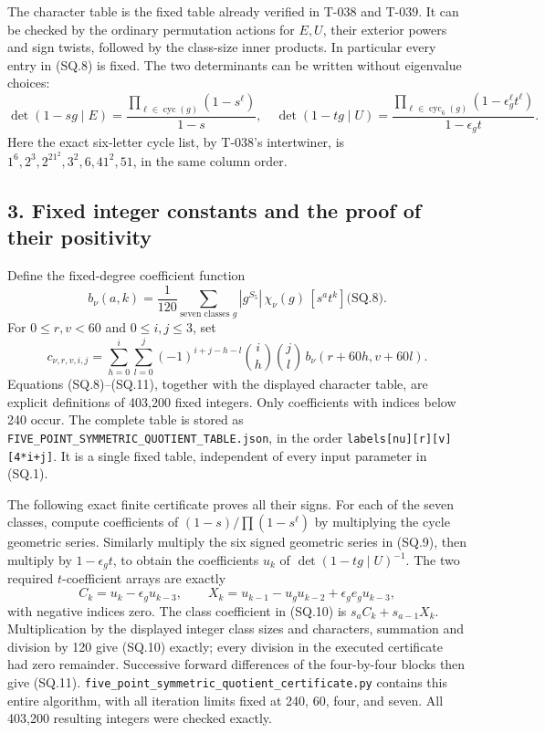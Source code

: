 \documentclass[
  10pt,
]{article}
\begin{document}
The character table is the fixed table already verified in T-038 and
T-039. It can be checked by the ordinary permutation actions for
\(E,U\), their exterior powers and sign twists, followed by the
class-size inner products. In particular every entry in (SQ.8) is fixed.
The two determinants can be written without eigenvalue choices: \[
\det(1-sg\mid E)=
\frac{\prod_{\ell\in\operatorname{cyc}(g)}(1-s^\ell)}{1-s},
\quad
\det(1-tg\mid U)=
\frac{\prod_{\ell\in\operatorname{cyc}_6(g)}
                      (1-\epsilon_g^\ell t^\ell)}{1-\epsilon_gt}.
\tag{SQ.9}
\] Here the exact six-letter cycle list, by T-038's intertwiner, is
\(1^6,2^3,2^21^2,3^2,6,41^2,51\), in the same column order.

\subsection{3. Fixed integer constants and the proof of their
positivity}\label{fixed-integer-constants-and-the-proof-of-their-positivity}

Define the fixed-degree coefficient function \[
b_\nu(a,k)=\frac1{120}\sum_{\text{seven classes }g}
|g^{S_5}|\,\chi_\nu(g)\,[s^at^k]\text{(SQ.8)}.
\tag{SQ.10}
\] For \(0\le r,v<60\) and \(0\le i,j\le3\), set \[
\boxed{c_{\nu,r,v,i,j}=
\sum_{h=0}^i\sum_{l=0}^j
(-1)^{i+j-h-l}\binom ih\binom jl\,
b_\nu(r+60h,v+60l).}
\tag{SQ.11}
\] Equations (SQ.8)--(SQ.11), together with the displayed character
table, are explicit definitions of 403,200 fixed integers. Only
coefficients with indices below 240 occur. The complete table is stored
as
\texttt{\small FIVE\_\allowbreak{}POINT\_\allowbreak{}SYMMETRIC\_\allowbreak{}QUOTIENT\_\allowbreak{}TABLE.json},
in the order
\texttt{\small labels[\allowbreak{}nu]\allowbreak{}[\allowbreak{}r]\allowbreak{}[\allowbreak{}v]\allowbreak{}[\allowbreak{}4*i+\allowbreak{}j]\allowbreak{}}.
It is a single fixed table, independent of every input parameter in
(SQ.1).

The following exact finite certificate proves all their signs. For each
of the seven classes, compute coefficients of \((1-s)/\prod(1-s^\ell)\)
by multiplying the cycle geometric series. Similarly multiply the six
signed geometric series in (SQ.9), then multiply by \(1-\epsilon_gt\),
to obtain the coefficients \(u_k\) of \(\det(1-tg\mid U)^{-1}\). The two
required \(t\)-coefficient arrays are exactly \[
C_k=u_k-\epsilon_gu_{k-3},\qquad
X_k=u_{k-1}-u_gu_{k-2}+\epsilon_ge_gu_{k-3},
\tag{SQ.12}
\] with negative indices zero. The class coefficient in (SQ.10) is
\(s_aC_k+s_{a-1}X_k\). Multiplication by the displayed integer class
sizes and characters, summation and division by 120 give (SQ.10)
exactly; every division in the executed certificate had zero remainder.
Successive forward differences of the four-by-four blocks then give
(SQ.11).
\texttt{\small five\_\allowbreak{}point\_\allowbreak{}symmetric\_\allowbreak{}quotient\_\allowbreak{}certificate.py}
contains this entire algorithm, with all iteration limits fixed at 240,
60, four, and seven. All 403,200 resulting integers were checked
exactly.
\end{document}
